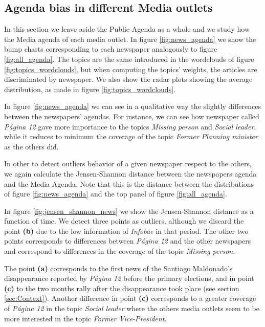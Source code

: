 \documentclass[a4paper, 12pt]{article}
\begin{document}
\subsection{Agenda bias in different Media outlets}

\par In this section we leave aside the Public Agenda as a whole and we study how the Media agenda of each media outlet. 
In figure \ref{fig:news_agenda} we show the bump charts corresponding to each newspaper analogously to figure \ref{fig:all_agenda}.
The topics are the same introduced in the wordclouds of figure \ref{fig:topics_wordclouds}, but when computing the topics' weights,  the articles are discriminated by newspaper. 
We also show the radar plots showing the average distribution, as made in figure \ref{fig:topics_wordclouds}. 
\par In figure \ref{fig:news_agenda} we can see in a qualitative way the slightly differences between the newspapers' agendas.
For instance, we can see how newspaper called \emph{P\'agina 12} gave more importance to the topics \emph{Missing person} and \emph{Social leader}, while it reduces to minimum the coverage of the topic  \emph{Former Planning minister} as the others did.


\par In other to detect outliers behavior of a given newspaper respect to the others, we again calculate the Jensen-Shannon distance between the newspapers agenda and the Media Agenda.
Note that this is the distance between the distributions of figure \ref{fig:news_agenda} and the top panel of figure \ref{fig:all_agenda}.
\par In figure \ref{fig:jensen_shannon_news} we show the Jensen-Shannon distance as a function of time.
We detect three points as outliers, although we discard the point \textbf{(b)} due to the low information of \emph{Infobae} in that period. 
The other two points corresponds to differences between \emph{P\'agina 12} and the other newspapers and correspond to differences in the coverage of the topic \emph{Missing person}.

\par The point \textbf{(a)} corresponds  to the first news of the Santiago Maldonado's disappearance  reported by \emph{P\'agina 12} before the primary elections, and in point \textbf{(c)} to  the two months rally after the disappearance took place (see section \ref{sec:Context}). Another difference in point \textbf{(c)} corresponds to a greater coverage of \emph{P\'agina 12} in the topic \emph{Social leader} where the others media outlets seem to be more interested in the topic \emph{Former Vice-President}.
\end{document}
